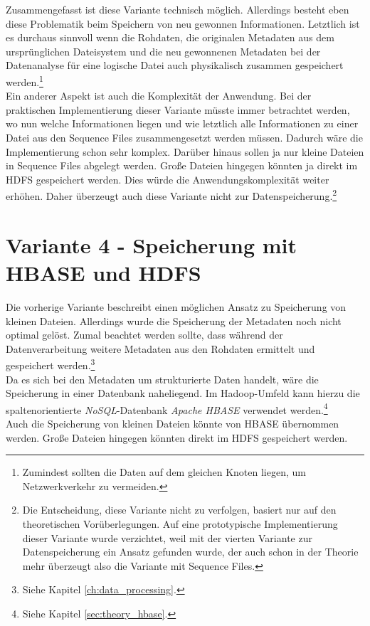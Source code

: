 \noindent
Zusammengefasst ist diese Variante technisch möglich. Allerdings besteht eben diese Problematik beim Speichern von neu gewonnen Informationen. Letztlich ist es durchaus sinnvoll wenn die Rohdaten, die originalen Metadaten aus dem ursprünglichen Dateisystem und die neu gewonnenen Metadaten bei der Datenanalyse für eine logische Datei auch physikalisch zusammen gespeichert werden.\footnote{Zumindest sollten die Daten auf dem gleichen Knoten liegen, um Netzwerkverkehr zu vermeiden.}\\ 
Ein anderer Aspekt ist auch die Komplexität der Anwendung. Bei der praktischen Implementierung dieser Variante müsste immer betrachtet werden, wo nun welche Informationen liegen und wie letztlich alle Informationen zu einer Datei aus den Sequence Files zusammengesetzt werden müssen. Dadurch wäre die Implementierung schon sehr komplex. Darüber hinaus sollen ja nur kleine Dateien in Sequence Files abgelegt werden. Große Dateien hingegen könnten ja direkt im HDFS gespeichert werden. Dies würde die Anwendungskomplexität weiter erhöhen. Daher überzeugt auch diese Variante nicht zur Datenspeicherung.\footnote{Die Entscheidung, diese Variante nicht zu verfolgen, basiert nur auf den theoretischen Vorüberlegungen. Auf eine prototypische Implementierung dieser Variante wurde verzichtet, weil mit der vierten Variante zur Datenspeicherung ein Ansatz gefunden wurde, der auch schon in der Theorie mehr überzeugt also die Variante mit Sequence Files.}

\section{Variante 4 - Speicherung mit HBASE und HDFS}
Die vorherige Variante beschreibt einen möglichen Ansatz zu Speicherung von kleinen Dateien. Allerdings wurde die Speicherung der Metadaten noch nicht optimal gelöst. Zumal beachtet werden sollte, dass während der Datenverarbeitung weitere Metadaten aus den Rohdaten ermittelt und gespeichert werden.\footnote{Siehe Kapitel \ref{ch:data_processing}.}\\
Da es sich bei den Metadaten um strukturierte Daten handelt, wäre die Speicherung in einer Datenbank naheliegend. Im Hadoop-Umfeld kann hierzu die spaltenorientierte \textit{NoSQL}-Datenbank \textit{Apache HBASE} verwendet werden.\footnote{Siehe Kapitel \ref{sec:theory_hbase}.}\\
Auch die Speicherung von kleinen Dateien könnte von HBASE übernommen werden. Große Dateien hingegen könnten direkt im HDFS gespeichert werden. 

